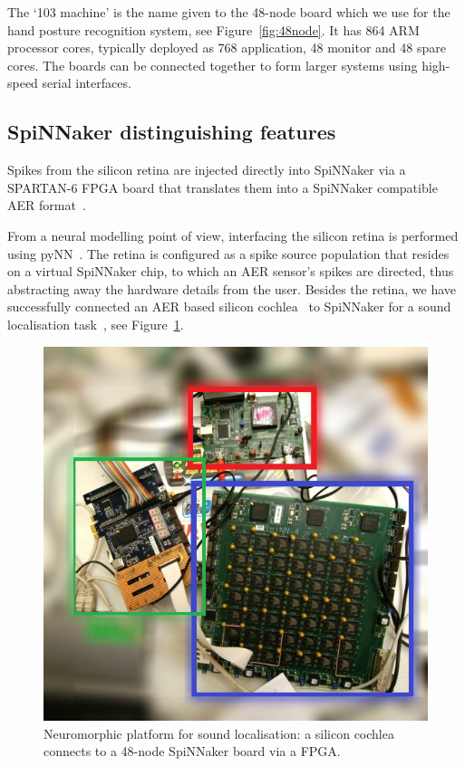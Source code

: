 The `103 machine' is the name given to the 48-node board which we use for the hand posture recognition system, see Figure~\ref{fig:48node}.
It has 864 ARM processor cores, typically deployed as 768 application, 48 monitor and 48 spare cores. 
The boards can be connected together to form larger systems using high-speed serial interfaces. 


\subsection{SpiNNaker distinguishing features}
Spikes from the silicon retina are injected directly into SpiNNaker via a SPARTAN-6 FPGA board that translates them into a SpiNNaker compatible AER format~\cite{appnote8}. 

From a neural modelling point of view, interfacing the silicon retina is performed using pyNN~\cite{davison2008pynn}. 
The retina is configured as a spike source population that resides on a virtual SpiNNaker chip, to which an AER sensor's spikes are directed, thus abstracting away the hardware details from the user\cite{galluppi2012real}.
Besides the retina, we have successfully connected an AER based silicon cochlea~\cite{5537164} to SpiNNaker for a sound localisation task~\cite{6706931}, see Figure~\ref{fig:sound}.

\begin{figure}[h!]
	\centering
	\includegraphics[width=\textwidth]{pics/photooutline_blurred.jpg}
	\caption{Neuromorphic platform for sound localisation: a silicon cochlea connects to a 48-node SpiNNaker board via a FPGA.}
	\label{fig:sound}
\end{figure}

